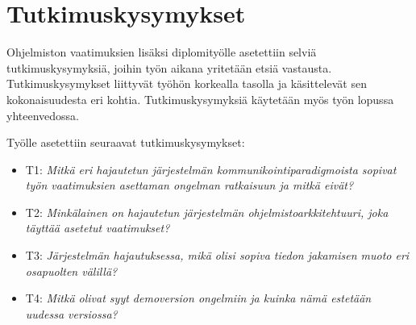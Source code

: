\section{Tutkimuskysymykset}
Ohjelmiston vaatimuksien lisäksi diplomityölle asetettiin selviä tutkimuskysymyksiä, joihin työn aikana yritetään etsiä vastausta. Tutkimuskysymykset liittyvät työhön korkealla tasolla ja käsittelevät sen kokonaisuudesta eri kohtia. Tutkimuskysymyksiä käytetään myös työn lopussa yhteenvedossa.

Työlle asetettiin seuraavat tutkimuskysymykset:
\begin{itemize}
	\item T1: \emph{Mitkä eri hajautetun järjestelmän kommunikointiparadigmoista sopivat työn vaatimuksien asettaman ongelman ratkaisuun ja mitkä eivät?}
	\item T2: \emph{Minkälainen on hajautetun järjestelmän ohjelmistoarkkitehtuuri, joka täyttää asetetut vaatimukset?}
	\item T3: \emph{Järjestelmän hajautuksessa, mikä olisi sopiva tiedon jakamisen muoto eri osapuolten välillä?}
	\item T4: \emph{Mitkä olivat syyt demoversion ongelmiin ja kuinka nämä estetään uudessa versiossa?}
\end{itemize}